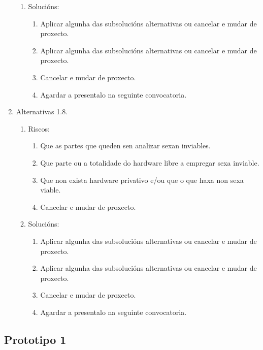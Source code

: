 \begin{enumerate}
\begin{enumerate}
         \item Solucións:
               \begin{enumerate}
                \item Aplicar algunha das subsolucións alternativas ou cancelar
                      e mudar de proxecto.
                \item Aplicar algunha das subsolucións alternativas ou cancelar
                      e mudar de proxecto.
                \item Cancelar e mudar de proxecto.
                \item Agardar a presentalo na seguinte convocatoria.
               \end{enumerate}
        \end{enumerate}
  \item Alternativas 1.8.
        \begin{enumerate}
         \item Riscos:
               \begin{enumerate}
                \item Que as partes que queden sen analizar sexan inviables.
                \item Que parte ou a totalidade do hardware libre a empregar
                      sexa inviable.
                \item Que non exista hardware privativo e/ou que o que haxa non
                      sexa viable.
                \item Cancelar e mudar de proxecto.
               \end{enumerate}
         \item Solucións:
               \begin{enumerate}
                \item Aplicar algunha das subsolucións alternativas ou cancelar
                      e mudar de proxecto.
                \item Aplicar algunha das subsolucións alternativas ou cancelar
                      e mudar de proxecto.
                \item Cancelar e mudar de proxecto.
                \item Agardar a presentalo na seguinte convocatoria.
               \end{enumerate}
        \end{enumerate}
 \end{enumerate}

 \subsection{Prototipo 1}

